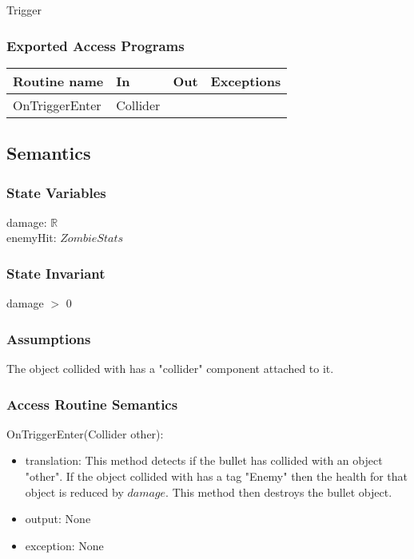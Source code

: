 \documentclass[12pt]{article}
\begin{document}
Trigger

\subsubsection* {Exported Access Programs}

\begin{tabular}{| l | l | l | l |}
	\hline
	\textbf{Routine name} & \textbf{In} & \textbf{Out} & \textbf{Exceptions}\\
	\hline
	OnTriggerEnter & Collider & ~  & ~\\
	\hline
\end{tabular}

\subsection* {Semantics}

\subsubsection* {State Variables}

damage: $\mathbb{R}$\\
enemyHit: $ZombieStats$

\subsubsection* {State Invariant}

damage $>$ 0
\subsubsection* {Assumptions}

The object collided with has a "collider" component attached to it.

\subsubsection* {Access Routine Semantics}

\noindent OnTriggerEnter(Collider other):
\begin{itemize}
	\item translation: This method detects if the bullet has collided with an object "other". If the object collided with has a tag "Enemy" then the health for that object is reduced by $damage$. This method then destroys the bullet object.
	\item output: None
	\item exception: None
\end{itemize}
\end{document}
